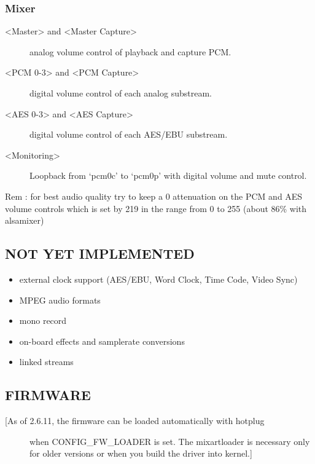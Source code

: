 \documentclass[a4paper,8pt,english]{sphinxmanual}
\begin{document}
\subsubsection{Mixer}
\label{sound/cards/mixart:mixer}\begin{description}
\item[{\textless{}Master\textgreater{} and \textless{}Master Capture\textgreater{}}] \leavevmode
analog volume control of playback and capture PCM.

\item[{\textless{}PCM 0-3\textgreater{} and \textless{}PCM Capture\textgreater{}}] \leavevmode
digital volume control of each analog substream.

\item[{\textless{}AES 0-3\textgreater{} and \textless{}AES Capture\textgreater{}}] \leavevmode
digital volume control of each AES/EBU substream.

\item[{\textless{}Monitoring\textgreater{}}] \leavevmode
Loopback from `pcm0c' to `pcm0p' with digital volume
and mute control.

\end{description}

Rem : for best audio quality try to keep a 0 attenuation on the PCM
and AES volume controls which is set by 219 in the range from 0 to 255
(about 86\% with alsamixer)


\subsection{NOT YET IMPLEMENTED}
\label{sound/cards/mixart:not-yet-implemented}\begin{itemize}
\item {} 
external clock support (AES/EBU, Word Clock, Time Code, Video Sync)

\item {} 
MPEG audio formats

\item {} 
mono record

\item {} 
on-board effects and samplerate conversions

\item {} 
linked streams

\end{itemize}


\subsection{FIRMWARE}
\label{sound/cards/mixart:firmware}\begin{description}
\item[{{[}As of 2.6.11, the firmware can be loaded automatically with hotplug}] \leavevmode
when CONFIG\_FW\_LOADER is set.  The mixartloader is necessary only
for older versions or when you build the driver into kernel.{]}

\end{description}
\end{document}

